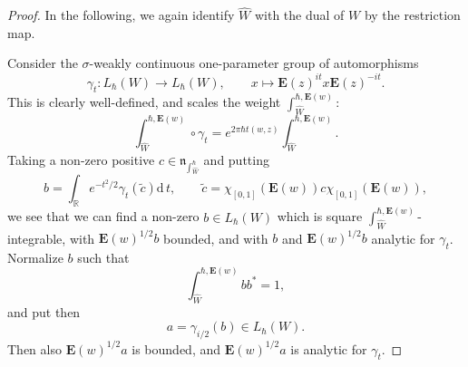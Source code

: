 \documentclass[10pt,a4paper]{amsart}
\def\R{\mathbb R}
\newcommand{\Eb}{\mathbf{E}}
\newcommand{\mfn}{\mathfrak{n}}
\newcommand{\rd}{\mathrm{d}\!\,}
\begin{document}
\begin{proof}
In the following, we again identify $\hat{W}$ with the dual of $W$ by the restriction map.

Consider the $\sigma$-weakly continuous one-parameter group of automorphisms 
\[
\gamma_t\colon  L_{\hbar}(W) \rightarrow L_{\hbar}(W),\qquad x \mapsto \Eb(z)^{it}x \Eb(z)^{-it}.
\]
This is clearly well-defined, and scales the weight $\int_{\hat{W}}^{\hbar,\Eb(w)}$:
\[
\int_{\hat{W}}^{\hbar,\Eb(w)} \circ \gamma_t = e^{2\pi\hbar t(w,z)}\int_{\hat{W}}^{\hbar,\Eb(w)}.
\]
Taking a non-zero positive $c \in \mfn_{\int_{\hat{W}}^{\hbar}}$ and putting 
\[
b = \int_{\R} e^{-t^2/2} \gamma_t (\widetilde{c})\rd t,\qquad \widetilde{c} = \chi_{[0,1]}(\Eb(w))c \chi_{[0,1]}(\Eb(w)),
\]
we see that we can find a non-zero $b \in L_{\hbar}(W)$ which is square $\int_{\hat{W}}^{\hbar,\Eb(w)}$-integrable, with $\Eb(w)^{1/2}b$ bounded, and with $b$ and  $\Eb(w)^{1/2}b$ analytic for $\gamma_t$. Normalize $b$ such that 
\begin{equation}\label{EqNormb}
\int_{\hat{W}}^{\hbar,\Eb(w)}bb^* =1,
\end{equation}
and put then 
\[
a = \gamma_{i/2}(b) \in L_{\hbar}(W).
\]
Then also $\Eb(w)^{1/2}a$ is bounded, and $\Eb(w)^{1/2}a$ is analytic for $\gamma_t$.


\end{proof}
\end{document}
